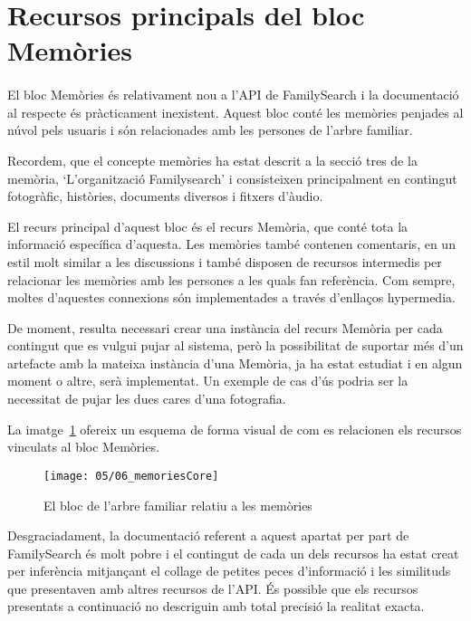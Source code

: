 \section{Recursos principals del bloc Memòries}

    \paragraph{}
    El bloc Memòries és relativament nou a l'API de FamilySearch i la documentació al respecte és pràcticament inexistent. Aquest bloc conté les memòries penjades al núvol pels usuaris i són relacionades amb les persones de l'arbre familiar.

    Recordem, que el concepte memòries ha estat descrit a la secció tres de la memòria, `L'organització Familysearch' i consisteixen principalment en contingut fotogràfic, històries, documents diversos i fitxers d'àudio.

    El recurs principal d'aquest bloc és el recurs Memòria, que conté tota la informació específica d'aquesta. Les memòries també contenen comentaris, en un estil molt similar a les discussions i també disposen de recursos intermedis per relacionar les memòries amb les persones a les quals fan referència. Com sempre, moltes d'aquestes connexions són implementades a través d'enllaços hypermedia.

    De moment, resulta necessari crear una instància del recurs Memòria per cada contingut que es vulgui pujar al sistema, però la possibilitat de suportar més d'un artefacte amb la mateixa instància d'una Memòria, ja ha estat estudiat i en algun moment o altre, serà implementat. Un exemple  de cas d'ús podria ser la necessitat de pujar les dues cares d'una fotografia.

    La imatge~\ref{img:memoriesBloc} ofereix un esquema de forma visual de com es relacionen els recursos vinculats al bloc Memòries.

    \begin{figure}[h]
        \texttt{[image: 05/06\_memoriesCore]}
        \centering
        \caption{El bloc de l'arbre familiar relatiu a les memòries}\label{img:memoriesBloc}
    \end{figure}

    Desgraciadament, la documentació referent a aquest apartat per part de Family\-Search és molt pobre i el contingut de cada un dels recursos ha estat creat per inferència mitjançant el collage de petites peces d'informació i les similituds que presentaven amb altres recursos de l'API. És possible que els recursos presentats a continuació no descriguin amb total precisió la realitat exacta.

